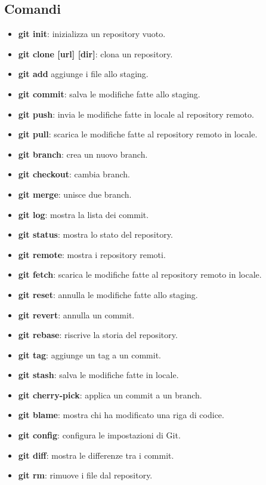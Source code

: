 \documentclass{article}
\begin{document}
\subsection{Comandi}
\begin{itemize}
    \item \textbf{git init}: inizializza un repository vuoto.
    \item \textbf{git clone [url] [dir]}: clona un repository.
    \item \textbf{git add } aggiunge i file allo staging.
    \item \textbf{git commit}: salva le modifiche fatte allo staging.
    \item \textbf{git push}: invia le modifiche fatte in locale al repository remoto.
    \item \textbf{git pull}: scarica le modifiche fatte al repository remoto in locale.
    \item \textbf{git branch}: crea un nuovo branch.
    \item \textbf{git checkout}: cambia branch.
    \item \textbf{git merge}: unisce due branch.
    \item \textbf{git log}: mostra la lista dei commit.
    \item \textbf{git status}: mostra lo stato del repository.
    \item \textbf{git remote}: mostra i repository remoti.
    \item \textbf{git fetch}: scarica le modifiche fatte al repository remoto in locale.
    \item \textbf{git reset}: annulla le modifiche fatte allo staging.
    \item \textbf{git revert}: annulla un commit.
    \item \textbf{git rebase}: riscrive la storia del repository.
    \item \textbf{git tag}: aggiunge un tag a un commit.
    \item \textbf{git stash}: salva le modifiche fatte in locale.
    \item \textbf{git cherry-pick}: applica un commit a un branch.
    \item \textbf{git blame}: mostra chi ha modificato una riga di codice.
    \item \textbf{git config}: configura le impostazioni di Git.
    \item \textbf{git diff}: mostra le differenze tra i commit.
    \item \textbf{git rm}: rimuove i file dal repository.

\end{itemize}
\end{document}
